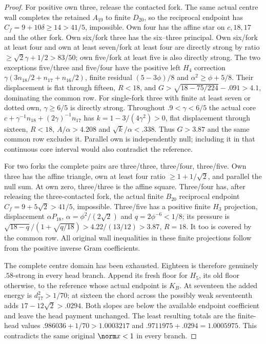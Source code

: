 \begin{proof}
For positive own three, release the contacted fork. The same
actual centre wall completes the retained $A_{19}$ to finite
$D_{20}$, so the reciprocal endpoint has
$C_f=9+10\delta\ge14>41/5$, impossible.
Own four has the affine star on $c,18,17$ and the other fork.
Own six/fork three has the six--three principal.
Own six/fork at least four and own at least seven/fork at
least four are directly strong by ratio
$\ge\sqrt2\gamma+1/2>83/50$; own five/fork at least five
is also directly strong.
The two exceptions five/three and five/four have the positive
left $H_4$ correction $\gamma(3n_{18}/2+n_{17}+n_{16}/2)$,
finite residual $(5-3\phi)/8$ and
$\alpha^2\ge\phi+5/8$.
Their displacement is flat through fifteen, $R<18$, and
$G>\sqrt{18-75/224}-.091>4.1$, dominating the common row.
For single-fork three with finite at least seven or dotted
own, $\gamma\ge6/5$ is directly strong. Throughout
$.9<\gamma<6/5$ the actual core
$c+\gamma^{-1}n_{18}+(2\gamma)^{-1}n_{17}$ has
$k=1-3/(4\gamma^2)>0$, flat displacement through sixteen,
$R<18$, $A/\alpha>4.208$ and $\sqrt k/\alpha<.338$.
Thus $G>3.87$ and the same common row excludes it.
Parallel own is independently null; including it in that
continuous core interval would also contradict the reference.

For two forks the complete pairs are three/three, three/four,
three/five. Own three has the affine triangle, own at least
four ratio $\ge1+1/\sqrt2$, and parallel the null sum.
At own zero, three/three is the affine square.
Three/four has, after releasing the three-contacted fork, the
actual finite $B_{20}$ reciprocal endpoint
$C_f=9+5\sqrt2>41/5$, impossible.
Three/five has a positive finite $H_3$ projection, displacement
$\alpha P_{18}$, $\alpha=\phi^2/(2\sqrt2)$ and
$q=2\phi^{-6}<1/8$; its pressure is
$\sqrt{18-q}/(1+\sqrt{q/18})>4.22/(13/12)>3.87$, $R=18$.
It too is covered by the common row. All original wall
inequalities in these finite projections follow from the
positive inverse Gram coefficients.

The complete centre domain has been exhausted. Eighteen is
therefore genuinely $.58$-strong in every head branch.
Append its fresh floor for $H_5$, its old floor otherwise,
to the reference whose actual endpoint is $K_B$.
At seventeen the added energy is $d_{17}^2>1/70$;
at sixteen the chord across the possibly weak seventeenth
adds $17-12\sqrt2>.0294$. Both slopes are below the available
endpoint coefficient and leave the head payment unchanged.
The least resulting totals are the finite-head values
$.986036+1/70>1.0003217$ and
$.9711975+.0294=1.0005975$.
This contradicts the same original $\norm x<1$ in every branch.
\end{proof}

